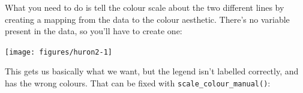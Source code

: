 What you need to do is tell the colour scale about the two different
lines by creating a mapping from the data to the colour aesthetic.
There's no variable present in the data, so you'll have to create one:

\begin{Shaded}
\begin{Highlighting}[]
\NormalTok{>}\StringTok{ }
\NormalTok{+}\StringTok{   }\NormalTok{(}\NormalTok{(} \StringTok{ }\NormalTok{, } \NormalTok{)) +}\StringTok{ }
\NormalTok{+}\StringTok{   }\NormalTok{(}\NormalTok{(} \StringTok{ }\NormalTok{, } \NormalTok{))}
\end{Highlighting}
\end{Shaded}

\texttt{[image: figures/huron2-1]}

This gets us basically what we want, but the legend isn't labelled
correctly, and has the wrong colours. That can be fixed with
\texttt{scale\_colour\_manual()}:

\begin{Shaded}
\begin{Highlighting}[]
\NormalTok{>}\StringTok{ }
\NormalTok{+}\StringTok{   }\NormalTok{(}\NormalTok{(} \StringTok{ }\NormalTok{, } \NormalTok{)) +}\StringTok{ }
\NormalTok{+}\StringTok{   }\NormalTok{(}\NormalTok{(} \StringTok{ }\NormalTok{, } \NormalTok{)) +}\StringTok{ }
\NormalTok{+}\StringTok{   }\NormalTok{(}\NormalTok{, }
\NormalTok{+}\StringTok{                       }\NormalTok{(} \NormalTok{=}\NormalTok{, } \NormalTok{=}\NormalTok{))}
\end{Highlighting}
\end{Shaded}

